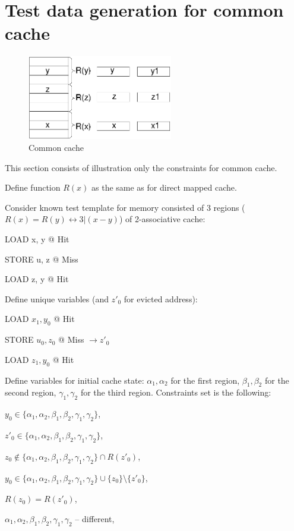 \section{Test data generation for common cache}

\begin{figure}[h]
\centering
\includegraphics[width=2.5in]{common}
\caption{Common cache} \label{common_cache}
\end{figure}

This section consists of illustration only the constraints for
common cache.

Define function $R(x)$ as the same as for direct mapped cache.

Consider known test template for memory consisted of 3 regions
($R(x) = R(y) \leftrightarrow 3 | (x-y)$) of 2-associative cache:

LOAD x, y @ Hit

STORE u, z @ Miss

LOAD z, y @ Hit

Define unique variables (and $z'_0$ for evicted address):

LOAD $x_1, y_0$ @ Hit

STORE $u_0, z_0$ @ Miss $\rightarrow z'_0$

LOAD $z_1, y_0$ @ Hit

Define variables for initial cache state: $\alpha_1, \alpha_2$ for
the first region, $\beta_1, \beta_2$ for the second region,
$\gamma_1, \gamma_2$ for the third region. Constraints set is the
following:

$y_0 \in \{ \alpha_1, \alpha_2, \beta_1, \beta_2, \gamma_1, \gamma_2
\}$,

$z'_0 \in \{ \alpha_1, \alpha_2, \beta_1, \beta_2, \gamma_1,
\gamma_2 \}$,

$z_0 \notin \{ \alpha_1, \alpha_2, \beta_1, \beta_2, \gamma_1,
\gamma_2 \} \cap R(z'_0)$,

$y_0 \in \{ \alpha_1, \alpha_2, \beta_1, \beta_2, \gamma_1, \gamma_2
\} \cup \{z_0\} \setminus \{z'_0\}$,

$R(z_0) = R(z'_0)$,

$\alpha_1, \alpha_2, \beta_1, \beta_2, \gamma_1, \gamma_2$ --
different,

